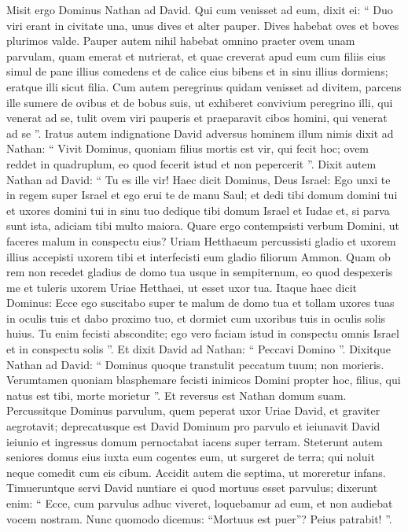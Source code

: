 \begin{biblechapter}
\begin{biblechapter}
\begin{biblechapter}
\begin{biblechapter}
\begin{biblechapter}
\begin{biblechapter}
\begin{biblechapter}
\begin{biblechapter}
\begin{biblechapter}
\begin{biblechapter}
\begin{biblechapter}
\begin{biblechapter}
\verse Misit ergo Dominus Nathan ad David. Qui cum venisset ad eum, dixit ei: “ Duo viri erant in civitate una, unus dives et alter pauper. 
\verse Dives habebat oves et boves plurimos valde. 
\verse Pauper autem nihil habebat omnino praeter ovem unam parvulam, quam emerat et nutrierat, et quae creverat apud eum cum filiis eius simul de pane illius comedens et de calice eius bibens et in sinu illius dormiens; eratque illi sicut filia. 
\verse Cum autem peregrinus quidam venisset ad divitem, parcens ille sumere de ovibus et de bobus suis, ut exhiberet convivium peregrino illi, qui venerat ad se, tulit ovem viri pauperis et praeparavit cibos homini, qui venerat ad se ”. 
\verse Iratus autem indignatione David adversus hominem illum nimis dixit ad Nathan: “ Vivit Dominus, quoniam filius mortis est vir, qui fecit hoc; 
\verse ovem reddet in quadruplum, eo quod fecerit istud et non pepercerit ”.
 \verse Dixit autem Nathan ad David: “ Tu es ille vir! Haec dicit Dominus, Deus Israel: Ego unxi te in regem super Israel et ego erui te de manu Saul; 
\verse et dedi tibi domum domini tui et uxores domini tui in sinu tuo dedique tibi domum Israel et Iudae et, si parva sunt ista, adiciam tibi multo maiora. 
\verse Quare ergo contempsisti verbum Domini, ut faceres malum in conspectu eius? Uriam Hetthaeum percussisti gladio et uxorem illius accepisti uxorem tibi et interfecisti eum gladio filiorum Ammon. 
\verse Quam ob rem non recedet gladius de domo tua usque in sempiternum, eo quod despexeris me et tuleris uxorem Uriae Hetthaei, ut esset uxor tua. 
\verse Itaque haec dicit Dominus: Ecce ego suscitabo super te malum de domo tua et tollam uxores tuas in oculis tuis et dabo proximo tuo, et dormiet cum uxoribus tuis in oculis solis huius. 
\verse Tu enim fecisti abscondite; ego vero faciam istud in conspectu omnis Israel et in conspectu solis ”.
 \verse Et dixit David ad Nathan: “ Peccavi Domino ”. Dixitque Nathan ad David: “ Dominus quoque transtulit peccatum tuum; non morieris. 
\verse Verumtamen quoniam blasphemare fecisti inimicos Domini propter hoc, filius, qui natus est tibi, morte morietur ”. 
\verse Et reversus est Nathan domum suam.
 Percussitque Dominus parvulum, quem peperat uxor Uriae David, et graviter aegrotavit; 
\verse deprecatusque est David Dominum pro parvulo et ieiunavit David ieiunio et ingressus domum pernoctabat iacens super terram. 
\verse Steterunt autem seniores domus eius iuxta eum cogentes eum, ut surgeret de terra; qui noluit neque comedit cum eis cibum. 
\verse Accidit autem die septima, ut moreretur infans. Timueruntque servi David nuntiare ei quod mortuus esset parvulus; dixerunt enim: “ Ecce, cum parvulus adhuc viveret, loquebamur ad eum, et non audiebat vocem nostram. Nunc quomodo dicemus: “Mortuus est puer”? Peius patrabit! ”. 

\end{biblechapter}
\end{biblechapter}
\end{biblechapter}
\end{biblechapter}
\end{biblechapter}
\end{biblechapter}
\end{biblechapter}
\end{biblechapter}
\end{biblechapter}
\end{biblechapter}
\end{biblechapter}
\end{biblechapter}
